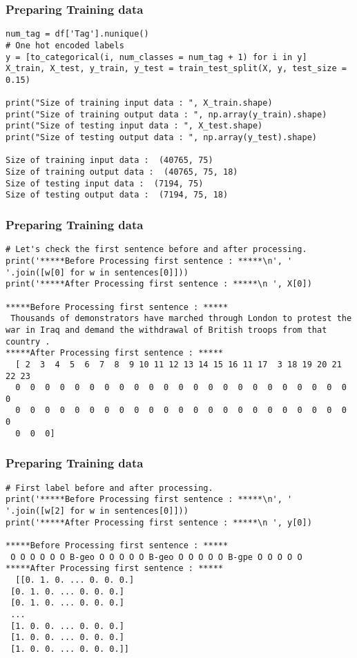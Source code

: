 \begin{frame}[fragile]\frametitle{Preparing Training data}

\begin{lstlisting}
num_tag = df['Tag'].nunique()
# One hot encoded labels
y = [to_categorical(i, num_classes = num_tag + 1) for i in y]
X_train, X_test, y_train, y_test = train_test_split(X, y, test_size = 0.15)

print("Size of training input data : ", X_train.shape)
print("Size of training output data : ", np.array(y_train).shape)
print("Size of testing input data : ", X_test.shape)
print("Size of testing output data : ", np.array(y_test).shape)

Size of training input data :  (40765, 75)
Size of training output data :  (40765, 75, 18)
Size of testing input data :  (7194, 75)
Size of testing output data :  (7194, 75, 18)
\end{lstlisting}
\end{frame}

\begin{frame}[fragile]\frametitle{Preparing Training data}

\begin{lstlisting}
# Let's check the first sentence before and after processing.
print('*****Before Processing first sentence : *****\n', ' '.join([w[0] for w in sentences[0]]))
print('*****After Processing first sentence : *****\n ', X[0])

*****Before Processing first sentence : *****
 Thousands of demonstrators have marched through London to protest the war in Iraq and demand the withdrawal of British troops from that country .
*****After Processing first sentence : *****
  [ 2  3  4  5  6  7  8  9 10 11 12 13 14 15 16 11 17  3 18 19 20 21 22 23
  0  0  0  0  0  0  0  0  0  0  0  0  0  0  0  0  0  0  0  0  0  0  0  0
  0  0  0  0  0  0  0  0  0  0  0  0  0  0  0  0  0  0  0  0  0  0  0  0
  0  0  0]
\end{lstlisting}
\end{frame}

\begin{frame}[fragile]\frametitle{Preparing Training data}

\begin{lstlisting}
# First label before and after processing.
print('*****Before Processing first sentence : *****\n', ' '.join([w[2] for w in sentences[0]]))
print('*****After Processing first sentence : *****\n ', y[0])

*****Before Processing first sentence : *****
 O O O O O O B-geo O O O O O B-geo O O O O O B-gpe O O O O O
*****After Processing first sentence : *****
  [[0. 1. 0. ... 0. 0. 0.]
 [0. 1. 0. ... 0. 0. 0.]
 [0. 1. 0. ... 0. 0. 0.]
 ...
 [1. 0. 0. ... 0. 0. 0.]
 [1. 0. 0. ... 0. 0. 0.]
 [1. 0. 0. ... 0. 0. 0.]]
\end{lstlisting}
\end{frame}


